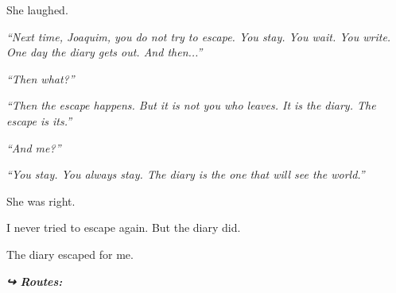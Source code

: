 \noindent She laughed.

\noindent \textit{\textquotedblleft{}Next time, Joaquim, you do not try to escape. You stay. You wait. You write. One day the diary gets out. And then...\textquotedblright{}}

\noindent \textit{\textquotedblleft{}Then what?\textquotedblright{}}

\noindent \textit{\textquotedblleft{}Then the escape happens. But it is not you who leaves. It is the diary. The escape is its.\textquotedblright{}}

\noindent \textit{\textquotedblleft{}And me?\textquotedblright{}}

\noindent \textit{\textquotedblleft{}You stay. You always stay. The diary is the one that will see the world.\textquotedblright{}}

\noindent She was right.

\noindent I never tried to escape again.
But the diary did.

\noindent The diary escaped for me.

\vspace{0.5em}
\noindent\textit{\textbf{↪ Routes:}  \rotasep {} \rotasep {}}
